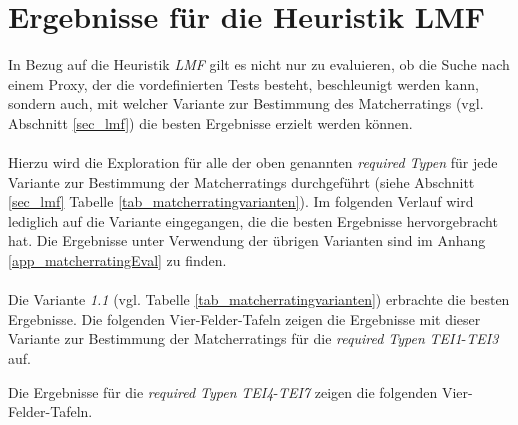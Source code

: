 \section{Ergebnisse für die Heuristik LMF}\label{sec_evalLMF}
In Bezug auf die Heuristik \emph{LMF} gilt es nicht nur zu evaluieren, ob die Suche nach einem Proxy, der die vordefinierten Tests besteht, beschleunigt werden kann, sondern auch, mit welcher Variante zur Bestimmung des Matcherratings (vgl. Abschnitt \ref{sec_lmf}) die besten Ergebnisse erzielt werden können. 
\\\\
Hierzu wird die Exploration für alle der oben genannten \emph{required Typen} für jede Variante zur Bestimmung der Matcherratings durchgeführt (siehe Abschnitt \ref{sec_lmf} Tabelle \ref{tab_matcherratingvarianten}). Im folgenden Verlauf wird lediglich auf die Variante eingegangen, die die besten Ergebnisse hervorgebracht hat. Die Ergebnisse unter Verwendung der übrigen Varianten sind im Anhang \ref{app_matcherratingEval} zu finden.
\\\\
Die Variante \emph{1.1} (vgl. Tabelle \ref{tab_matcherratingvarianten}) erbrachte die besten Ergebnisse. Die folgenden Vier-Felder-Tafeln zeigen die Ergebnisse mit dieser Variante zur Bestimmung der Matcherratings für die \emph{required Typen} \emph{TEI1}-\emph{TEI3} auf.
\begin{multicols}{3}
\end{multicols}
\noindent
Die Ergebnisse für die \emph{required Typen} \emph{TEI4}-\emph{TEI7} zeigen die folgenden Vier-Felder-Tafeln. 
\begin{multicols}{2}
\end{multicols}

\begin{multicols}{2}
\end{multicols}

